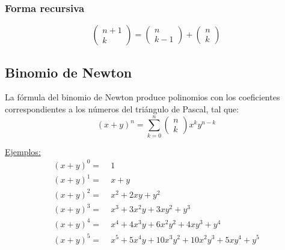 \documentclass[../main.tex]{subfiles}
\begin{document}
{{        \subsubsection{Forma recursiva} {
            \begin{equation*}
                \begin{pmatrix} n+1\\k \end{pmatrix} = 
                \begin{pmatrix} n\\k-1 \end{pmatrix} +
                \begin{pmatrix} n\\k \end{pmatrix}
            \end{equation*}
        }
        
}

    \subsection{Binomio de Newton} {
        La fórmula del binomio de Newton produce polinomios con los coeficientes
        correspondientes a los números del triángulo de Pascal, tal que:
        \begin{equation*}
            (x+y)^n = \sum_{k=0}^n \begin{pmatrix}n\\k\end{pmatrix} x^k y^{n-k}
        \end{equation*}
        
        \nln \ul{Ejemplos:}
        \begin{align*}
            (x+y)^0 =& \;1                                                  \\
            (x+y)^1 =& \;x+y                                                \\
            (x+y)^2 =& \;x^2+2xy+y^2                                        \\
            (x+y)^3 =& \;x^3+3x^2y+3xy^2+y^3                                \\
            (x+y)^4 =& \;x^4 + 4x^3y +6x^2y^2 + 4xy^3 + y^4                 \\
            (x+y)^5 =& \;x^5 + 5x^4y + 10x^3y^2 +10x^2y^3 + 5xy^4 + y^5
        \end{align*}
    }
}
\newpage
\end{document}
